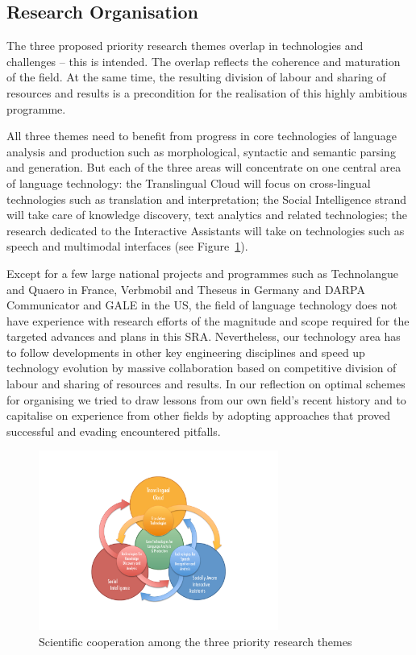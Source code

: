 \documentclass[10pt, plain]{../../metanetpaper}
\begin{document}
\begin{multicols}{2}
\subsection[Structure and Principles of Research Organisation]{Research Organisation}
\label{sec:struct-princ-research-org}

The three proposed priority  research themes overlap in technologies and challenges -- this is intended. The overlap reflects the coherence and maturation of the field. At the same time, the resulting division of labour and sharing of resources and results is a precondition for the realisation of this highly ambitious programme.

All three themes need to benefit from progress in core technologies of language analysis and production such as morphological, syntactic and semantic parsing and generation. But each of the three areas will concentrate on one central area of language technology: the Translingual Cloud will focus on cross-lingual technologies such as translation and interpretation; the Social Intelligence strand will take care of knowledge discovery, text analytics and related technologies; the research dedicated to the Interactive Assistants will take on technologies such as speech and multimodal interfaces (see Figure~\ref{fig:priority-themes}).

Except for a few large national projects and programmes such as Technolangue and Quaero in France, Verbmobil and Theseus in Germany and DARPA Communicator and GALE in the US, the field of language technology does not have experience with research efforts of the magnitude and scope required for the targeted advances and plans in this SRA. Nevertheless, our technology area has to follow developments in other key engineering disciplines and speed up technology evolution by massive collaboration based on competitive division of labour and sharing of resources and results. In our reflection on optimal schemes for organising we tried to draw lessons from our own field's recent history and to capitalise on experience from other fields by adopting approaches that proved successful and evading encountered pitfalls.
 
\begin{figure}[htb]
  \center
  \includegraphics[width=0.70\textwidth]{../_media/PT-Rings}
  \caption{Scientific cooperation among the three priority research themes}
  \label{fig:priority-themes}
\end{figure}
 

\end{multicols}
\end{document}
